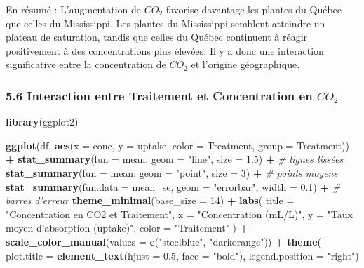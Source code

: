\documentclass[
]{article}
\newenvironment{Shaded}{\begin{snugshade}}{\end{snugshade}}
\newcommand{\AttributeTok}[1]{\textcolor[rgb]{0.13,0.29,0.53}{#1}}
\newcommand{\CommentTok}[1]{\textcolor[rgb]{0.56,0.35,0.01}{\textit{#1}}}
\newcommand{\DecValTok}[1]{\textcolor[rgb]{0.00,0.00,0.81}{#1}}
\newcommand{\FloatTok}[1]{\textcolor[rgb]{0.00,0.00,0.81}{#1}}
\newcommand{\FunctionTok}[1]{\textcolor[rgb]{0.13,0.29,0.53}{\textbf{#1}}}
\newcommand{\NormalTok}[1]{#1}
\newcommand{\SpecialCharTok}[1]{\textcolor[rgb]{0.81,0.36,0.00}{\textbf{#1}}}
\newcommand{\StringTok}[1]{\textcolor[rgb]{0.31,0.60,0.02}{#1}}
\begin{document}
En résumé : L'augmentation de \(CO_2\) favorise davantage les plantes du
Québec que celles du Mississippi. Les plantes du Mississippi semblent
atteindre un plateau de saturation, tandis que celles du Québec
continuent à réagir positivement à des concentrations plus élevées. Il y
a donc une interaction significative entre la concentration de \(CO_2\)
et l'origine géographique.

\subsubsection{\texorpdfstring{5.6 Interaction entre Traitement et
Concentration en
\(CO_2\)}{5.6 Interaction entre Traitement et Concentration en CO\_2}}\label{interaction-entre-traitement-et-concentration-en-co_2}

\begin{Shaded}
\begin{Highlighting}[]
\FunctionTok{library}\NormalTok{(ggplot2)}

\FunctionTok{ggplot}\NormalTok{(df, }\FunctionTok{aes}\NormalTok{(}\AttributeTok{x =}\NormalTok{ conc, }\AttributeTok{y =}\NormalTok{ uptake, }\AttributeTok{color =}\NormalTok{ Treatment, }\AttributeTok{group =}\NormalTok{ Treatment)) }\SpecialCharTok{+}
  \FunctionTok{stat\_summary}\NormalTok{(}\AttributeTok{fun =}\NormalTok{ mean, }\AttributeTok{geom =} \StringTok{"line"}\NormalTok{, }\AttributeTok{size =} \FloatTok{1.5}\NormalTok{) }\SpecialCharTok{+}               \CommentTok{\# lignes lissées}
  \FunctionTok{stat\_summary}\NormalTok{(}\AttributeTok{fun =}\NormalTok{ mean, }\AttributeTok{geom =} \StringTok{"point"}\NormalTok{, }\AttributeTok{size =} \DecValTok{3}\NormalTok{) }\SpecialCharTok{+}                \CommentTok{\# points moyens}
  \FunctionTok{stat\_summary}\NormalTok{(}\AttributeTok{fun.data =}\NormalTok{ mean\_se, }\AttributeTok{geom =} \StringTok{"errorbar"}\NormalTok{, }\AttributeTok{width =} \FloatTok{0.1}\NormalTok{) }\SpecialCharTok{+}  \CommentTok{\# barres d’erreur}
  \FunctionTok{theme\_minimal}\NormalTok{(}\AttributeTok{base\_size =} \DecValTok{14}\NormalTok{) }\SpecialCharTok{+}
  \FunctionTok{labs}\NormalTok{(}
    \AttributeTok{title =} \StringTok{"Concentration en CO2 et Traitement"}\NormalTok{,}
    \AttributeTok{x =} \StringTok{"Concentration (mL/L)"}\NormalTok{,}
    \AttributeTok{y =} \StringTok{"Taux moyen d’absorption (uptake)"}\NormalTok{,}
    \AttributeTok{color =} \StringTok{"Traitement"}
\NormalTok{  ) }\SpecialCharTok{+}
  \FunctionTok{scale\_color\_manual}\NormalTok{(}\AttributeTok{values =} \FunctionTok{c}\NormalTok{(}\StringTok{"steelblue"}\NormalTok{, }\StringTok{"darkorange"}\NormalTok{)) }\SpecialCharTok{+}
  \FunctionTok{theme}\NormalTok{(}
    \AttributeTok{plot.title =} \FunctionTok{element\_text}\NormalTok{(}\AttributeTok{hjust =} \FloatTok{0.5}\NormalTok{, }\AttributeTok{face =} \StringTok{"bold"}\NormalTok{),}
    \AttributeTok{legend.position =} \StringTok{"right"}\NormalTok{)}
\end{Highlighting}
\end{Shaded}
\end{document}
